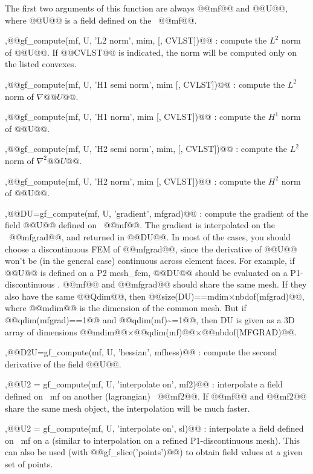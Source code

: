 \begin{cmddescription}
  The first two arguments of this function are always @@mf@@ and
  @@U@@, where @@U@@ is a field defined on the \tmf\ @@mf@@.

  \sep{@@gf\_compute(mf, U, 'L2 norm', mim, [, CVLST])@@} : 
  compute the $L^2$ norm of @@U@@. If @@CVLST@@ is indicated, the norm will be
  computed only on the listed convexes.

  \sep{@@gf\_compute(mf, U, 'H1 semi norm', mim [, CVLST])@@} :
  compute the $L^2$ norm of $\nabla @@U@@$.

  \sep{@@gf\_compute(mf, U, 'H1 norm', mim [, CVLST])@@} :
  compute the $H^1$ norm of @@U@@.
  
  \sep{@@gf\_compute(mf, U, 'H2 semi norm', mim, [, CVLST])@@} :
  compute the $L^2$ norm of $\nabla^2 @@U@@$.

  \sep{@@gf\_compute(mf, U, 'H2 norm', mim [, CVLST])@@} :
  compute the $H^2$ norm of @@U@@.

  \sep{@@DU=gf\_compute(mf, U, 'gradient', mfgrad)@@} :  compute the gradient
  of the field @@U@@ defined on \tmf\ @@mf@@. The gradient is
  interpolated on the \tmf\ @@mfgrad@@, and returned in @@DU@@.  In
  most of the cases, you should choose a discontinuous FEM of
  @@mfgrad@@, since the derivative of @@U@@ won't be (in the general
  case) continuous across element faces.  For example, if @@U@@ is
  defined on a P2 mesh\_fem, @@DU@@ should be evaluated on a
  P1-discontinuous \tmf. @@mf@@ and @@mfgrad@@ should share the same
  mesh.  If they also have the same @@Qdim@@, then
  @@size(DU)==mdim$\times$nbdof(mfgrad)@@, where @@mdim@@ is the dimension of the
  common mesh. But if @@qdim(mfgrad)==1@@ and @@qdim(mf)\~{}=1@@, then DU is given
  as a 3D array of dimensions @@mdim@@$\times$@@qdim(mf)@@$\times$@@nbdof(MFGRAD)@@.

  \sep{@@D2U=gf\_compute(mf, U, 'hessian', mfhess)@@} : compute the second derivative of the field @@U@@.

  \sep{@@U2 = gf\_compute(mf, U, 'interpolate on', mf2)@@} : 
  interpolate a field defined on \tmf\ mf on another (lagrangian)
  \tmf\ @@mf2@@. If @@mf@@ and @@mf2@@ share the same mesh object, the 
  interpolation will be much faster.
  
  \sep{@@U2 = gf\_compute(mf, U, 'interpolate on', sl)@@} :
  interpolate a field defined on \tmf\ mf on a
  \slc (similar to interpolation on a refined P1-discontinuous mesh).
  This can also be used (with @@gf_slice('points')@@) to obtain field
  values at a given set of points.


\end{cmddescription}
